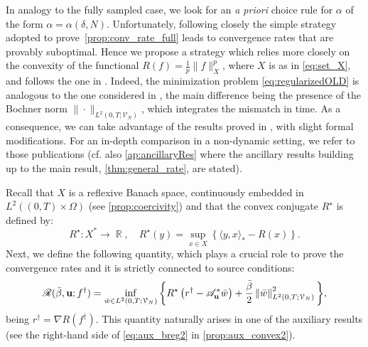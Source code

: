 \documentclass[11pt,a4paper]{article}
\numberwithin{equation}{section}
\DeclareMathOperator{\R}{\mathbb{R}}
\newcommand{\norm}[1]{\left\lVert#1\right\rVert}
\newcommand{\msR}{\mathscr{R}}
\newcommand{\bu}{{\bf u}}
\newcommand{\cAbu}{\mathscr{A}_{\bu}}
\def\sdiff{r}
\begin{document}
In analogy to the fully sampled case, we %
look for an \textit{a priori} choice rule for $\alpha$ of the form $\alpha = \alpha(\delta,N)$. Unfortunately, following closely the simple strategy adopted to prove~\cref{prop:conv_rate_full} leads to convergence rates that are provably suboptimal. 
Hence we propose a strategy which relies more closely on the convexity of the functional $R(f) = \frac{1}{p} \| f \|^p_{X}$, where $X$ is as in \eqref{eq:set_X}, and follows the one in \cite{bubba2021,Bubba22}. 
Indeed, the minimization problem \eqref{eq:regularizedOLD} is analogous to the one considered in \cite{bubba2021,Bubba22}, the main difference being the presence of the Bochner norm $\|\cdot\|_{L^2(0,T;\mathcal{V}_N)}$, which integrates the mismatch in time. As a consequence, we can take advantage of the results proved in \cite{bubba2021,Bubba22}, with slight formal modifications.
For an in-depth comparison
in a non-dynamic setting, we refer to those publications (cf. also \cref{ap:ancillaryRes} where the ancillary results building up to the main result, \cref{thm:general_rate}, are stated).


Recall that $X$ is a reflexive Banach space, continuously embedded in $L^2((0,T)\times \Omega)$ (see \cref{prop:coercivity}) and that 
the convex conjugate $R^\star$ is defined by:
\[
R^\star\colon X^* \rightarrow \R, \quad R^\star(y) = \sup_{x \in X} \left\{\langle y, x \rangle_* - R(x) \right\}.
\]
Next, we define the following quantity, which plays a crucial role to prove the convergence rates and it is strictly connected to source conditions:\begin{equation}\label{eq:Rbeautiful}
	\msR(\bar{\beta}, \bu; f^\dag) = \inf_{\bar w\in L^2(0,T;\mathcal{V}_N)} 
	\bigg\{
	R^\star\left(\sdiff^\dag - \cAbu^* \bar w\right) + \frac{\bar{\beta}}{2} \norm{\bar{w}}_{L^2(0,T;\mathcal{V}_N)}^2
	\bigg\},
\end{equation}
being $\sdiff^\dag = \nabla R(f^\dag)$. This quantity naturally arises in one of the auxiliary results (see the right-hand side of \eqref{eq:aux_breg2} in \cref{prop:aux_convex2}).
\end{document}
